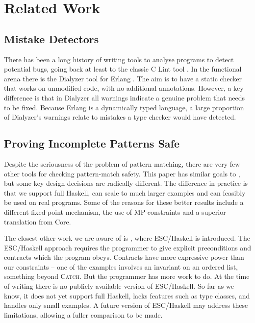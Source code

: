 \documentclass[preprint]{sigplanconf}
\newcommand{\catch}{\textsc{Catch}}
\begin{document}
\section{Related Work}
\label{sec:related}

\subsection{Mistake Detectors}

There has been a long history of writing tools to analyse programs to detect potential bugs, going back at least to the classic C Lint tool \citep{lint}. In the functional arena there is the Dialyzer tool \citep{dialyzer} for Erlang \citep{erlang}. The aim is to have a static checker that works on unmodified code, with no additional annotations. However, a key difference is that in Dialyzer all warnings indicate a genuine problem that needs to be fixed. Because Erlang is a dynamically typed language, a large proportion of Dialyzer's warnings relate to mistakes a type checker would have detected.

\subsection{Proving Incomplete Patterns Safe}

Despite the seriousness of the problem of pattern matching, there are very few other tools for checking pattern-match safety. This paper has similar goals to \citet{me:catch_tfp}, but some key design decisions are radically different. The difference in practice is that we support full Haskell, can scale to much larger examples and can feasibly be used on real programs. Some of the reasons for these better results include a different fixed-point mechanism, the use of MP-constraints and a superior translation from Core.

The closest other work we are aware of is \citep{esc_haskell}, where ESC/Haskell is introduced. The ESC/Haskell approach requires the programmer to give explicit preconditions and contracts which the program obeys. Contracts have more expressive power than our constraints -- one of the examples involves an invariant on an ordered list, something beyond \catch{}. But the programmer has more work to do. At the time of writing there is no publicly available version of ESC/Haskell. So far as we know, it does not yet support full Haskell, lacks features such as type classes, and handles only small examples. A future version of ESC/Haskell may address these limitations, allowing a fuller comparison to be made.
\end{document}
